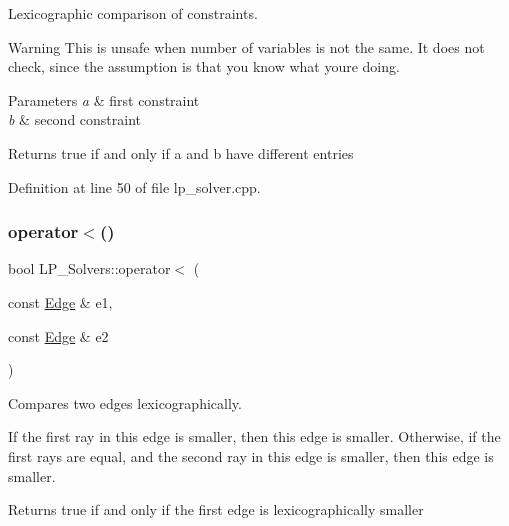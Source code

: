 Lexicographic comparison of constraints. 

\begin{DoxyWarning}{Warning}
This is unsafe when number of variables is not the same. It does not check, since the assumption is that you know what you\textquotesingle{}re doing. 
\end{DoxyWarning}

\begin{DoxyParams}{Parameters}
{\em a} & first constraint \\
\hline
{\em b} & second constraint \\
\hline
\end{DoxyParams}
\begin{DoxyReturn}{Returns}
{\ttfamily true} if and only if {\ttfamily a} and {\ttfamily b} have different entries 
\end{DoxyReturn}


Definition at line 50 of file lp\+\_\+solver.\+cpp.

\mbox{\label{namespace_l_p___solvers_aa582ccdb98a58f0c688aefa89bb7cdf1}} 
\subsubsection{\texorpdfstring{operator$<$()}{operator<()}\hspace{0.1cm}{\footnotesize\ttfamily [2/3]}}
{\footnotesize\ttfamily bool L\+P\+\_\+\+Solvers\+::operator$<$ (\begin{DoxyParamCaption}\item[{const \hyperlink{group___c_l_s_solvers_class_l_p___solvers_1_1_edge}{Edge} \&}]{e1,  }\item[{const \hyperlink{group___c_l_s_solvers_class_l_p___solvers_1_1_edge}{Edge} \&}]{e2 }\end{DoxyParamCaption})}



Compares two edges lexicographically. 

If the first ray in {\ttfamily this} edge is smaller, then {\ttfamily this} edge is smaller. Otherwise, if the first rays are equal, and the second ray in {\ttfamily this} edge is smaller, then {\ttfamily this} edge is smaller.

\begin{DoxyReturn}{Returns}
{\ttfamily true} if and only if the first edge is lexicographically smaller
\end{DoxyReturn}

